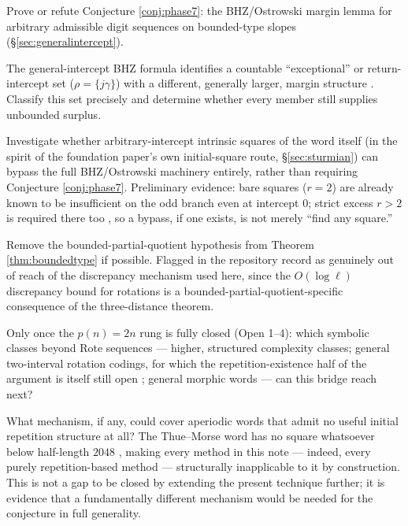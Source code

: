 \documentclass[11pt]{article}
\begin{document}
\begin{description}[leftmargin=3em,style=nextline]
\item[Open 1 --- General intercept margin.] Prove or refute Conjecture \ref{conj:phase7}: the BHZ/Ostrowski margin lemma for arbitrary admissible digit sequences on bounded-type slopes (\S\ref{sec:generalintercept}).
\item[Open 2 --- Return/exceptional intercept set.] The general-intercept BHZ formula identifies a countable ``exceptional'' or return-intercept set ($\rho=\{j\gamma\}$) with a different, generally larger, margin structure \cite{BHZGeneralMap}. Classify this set precisely and determine whether every member still supplies unbounded surplus.
\item[Open 3 --- Intrinsic-square bypass.] Investigate whether arbitrary-intercept intrinsic squares of the word itself (in the spirit of the foundation paper's own initial-square route, \S\ref{sec:sturmian}) can bypass the full BHZ/Ostrowski machinery entirely, rather than requiring Conjecture \ref{conj:phase7}. Preliminary evidence: bare squares ($r=2$) are already known to be insufficient on the odd branch even at intercept $0$; strict excess $r>2$ is required there too \cite{Phase7Intrinsic}, so a bypass, if one exists, is not merely ``find any square.''
\item[Open 4 --- General CS Rote.] Remove the bounded-partial-quotient hypothesis from Theorem \ref{thm:boundedtype} if possible. Flagged in the repository record as genuinely out of reach of the discrepancy mechanism used here, since the $O(\log\ell)$ discrepancy bound for rotations is a bounded-partial-quotient-specific consequence of the three-distance theorem.
\item[Open 5 --- Higher complexity.] Only once the $p(n)=2n$ rung is fully closed (Open 1--4): which symbolic classes beyond Rote sequences --- higher, structured complexity classes; general two-interval rotation codings, for which the repetition-existence half of the argument is itself still open \cite{Phase2Rotation}; general morphic words --- can this bridge reach next?
\item[Open 6 --- The full Periodicity Conjecture.] What mechanism, if any, could cover aperiodic words that admit no useful initial repetition structure at all? The Thue--Morse word has no square whatsoever below half-length $2048$ \cite{Phase1Gap}, making every method in this note --- indeed, every purely repetition-based method --- structurally inapplicable to it by construction. This is not a gap to be closed by extending the present technique further; it is evidence that a fundamentally different mechanism would be needed for the conjecture in full generality.
\end{description}
\end{document}
